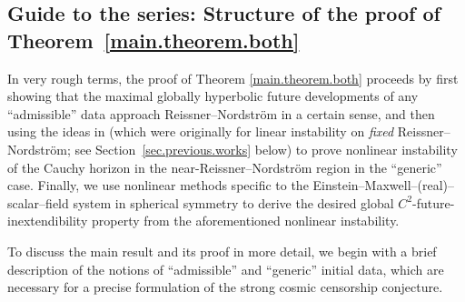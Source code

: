 \documentclass[10pt, reqno]{amsart}
\theoremstyle{definition}
\theoremstyle{remark}
\numberwithin{equation}{section}
\newcommand{\0}{\emptyset}
\begin{document}
\subsection{Guide to the series: Structure of the proof of Theorem~\ref{main.theorem.both}}\label{sec.main.structure}

In very rough terms, the proof of Theorem \ref{main.theorem.both} proceeds by first showing that the maximal globally hyperbolic future developments of any ``admissible'' data approach Reissner--Nordstr\"om in a certain sense, and then using the ideas in \cite{LO.instab} (which were originally for linear instability on \emph{fixed} Reissner--Nordstr\"om; see Section~\ref{sec.previous.works} below) to prove nonlinear instability of the Cauchy horizon in the near-Reissner--Nordstr\"om region in the ``generic'' case. Finally, we use nonlinear methods specific to the Einstein--Maxwell--(real)--scalar--field system in spherical symmetry to derive the desired global $C^{2}$-future-inextendibility property from the aforementioned nonlinear instability. 

To discuss the main result and its proof in more detail, we begin with a brief description of the notions of ``admissible'' and ``generic'' initial data, which are necessary for a precise formulation of the strong cosmic censorship conjecture.
\end{document}
